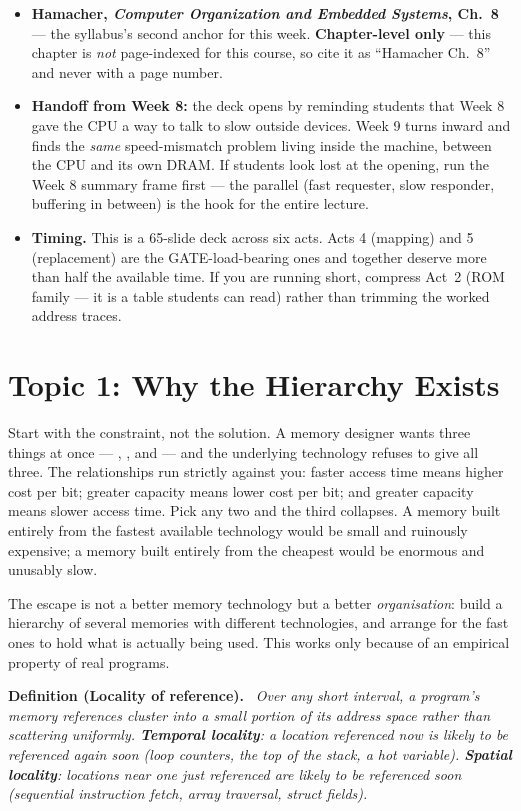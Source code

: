 \documentclass[11pt]{article}
\newenvironment{definitionbox}[1]{\par\noindent\textbf{Definition (#1).}\ \itshape}{\par\vspace{0.3em}}
\begin{document}
\begin{sloppypar}
\begin{itemize}
  \item \textbf{Hamacher, \textit{Computer Organization and Embedded Systems}, Ch.~8} --- the syllabus's second anchor for this week. \textbf{Chapter-level only} --- this chapter is \emph{not} page-indexed for this course, so cite it as ``Hamacher Ch.~8'' and never with a page number.
  \item \textbf{Handoff from Week 8:} the deck opens by reminding students that Week 8 gave the CPU a way to talk to slow outside devices. Week 9 turns inward and finds the \emph{same} speed-mismatch problem living inside the machine, between the CPU and its own DRAM. If students look lost at the opening, run the Week 8 summary frame first --- the parallel (fast requester, slow responder, buffering in between) is the hook for the entire lecture.
  \item \textbf{Timing.} This is a 65-slide deck across six acts. Acts 4 (mapping) and 5 (replacement) are the GATE-load-bearing ones and together deserve more than half the available time. If you are running short, compress Act~2 (ROM family --- it is a table students can read) rather than trimming the worked address traces.
\end{itemize}
\end{sloppypar}

\section{Topic 1: Why the Hierarchy Exists}

Start with the constraint, not the solution. A memory designer wants three things at once --- , , and  --- and the underlying technology refuses to give all three. The relationships run strictly against you: faster access time means higher cost per bit; greater capacity means lower cost per bit; and greater capacity means slower access time. Pick any two and the third collapses. A memory built entirely from the fastest available technology would be small and ruinously expensive; a memory built entirely from the cheapest would be enormous and unusably slow.

The escape is not a better memory technology but a better \emph{organisation}: build a hierarchy of several memories with different technologies, and arrange for the fast ones to hold what is actually being used. This works only because of an empirical property of real programs.

\begin{definitionbox}{Locality of reference}
Over any short interval, a program's memory references cluster into a small portion of its address space rather than scattering uniformly. \textbf{Temporal locality}: a location referenced now is likely to be referenced again soon (loop counters, the top of the stack, a hot variable). \textbf{Spatial locality}: locations \emph{near} one just referenced are likely to be referenced soon (sequential instruction fetch, array traversal, struct fields).
\end{definitionbox}
\end{document}
